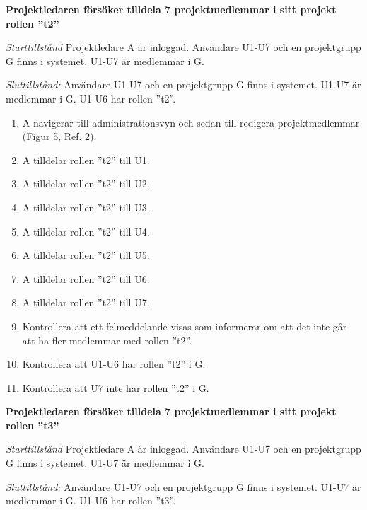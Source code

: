 \documentclass[a4paper]{article}
\begin{document}
\begin{FT}
\item
\textbf{Projektledaren försöker tilldela 7 projektmedlemmar i sitt projekt rollen ''t2''}

\emph{Starttillstånd} Projektledare A är inloggad. Användare U1-U7 och en projektgrupp G finns i systemet. U1-U7 är medlemmar i G.

\emph{Sluttillstånd:} Användare U1-U7 och en projektgrupp G finns i systemet. U1-U7 är medlemmar i G. U1-U6 har rollen ''t2''.

\begin{enumerate}
\item A navigerar till administrationsvyn och sedan till redigera projektmedlemmar (Figur 5, Ref. 2).
\item A tilldelar rollen ''t2'' till U1.
\item A tilldelar rollen ''t2'' till U2.
\item A tilldelar rollen ''t2'' till U3.
\item A tilldelar rollen ''t2'' till U4.
\item A tilldelar rollen ''t2'' till U5.
\item A tilldelar rollen ''t2'' till U6.
\item A tilldelar rollen ''t2'' till U7.
\item Kontrollera att ett felmeddelande visas som informerar om att det inte går att ha fler medlemmar med rollen ''t2''.
\item Kontrollera att U1-U6 har rollen ''t2'' i G.
\item Kontrollera att U7 inte har rollen ''t2'' i G.
\end{enumerate}

\item
\textbf{Projektledaren försöker tilldela 7 projektmedlemmar i sitt projekt rollen ''t3''}

\emph{Starttillstånd} Projektledare A är inloggad. Användare U1-U7 och en projektgrupp G finns i systemet. U1-U7 är medlemmar i G.

\emph{Sluttillstånd:} Användare U1-U7 och en projektgrupp G finns i systemet. U1-U7 är medlemmar i G. U1-U6 har rollen ''t3''.


\end{FT}
\end{document}
